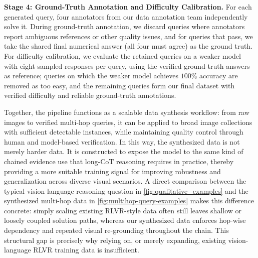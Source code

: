 \textbf{Stage 4: Ground-Truth Annotation and Difficulty Calibration.}
For each generated query, four annotators from our data annotation team independently solve it.
During ground-truth annotation, we discard queries where annotators report ambiguous references or other quality issues, and for queries that pass, we take the shared final numerical answer (all four must agree) as the ground truth.
For difficulty calibration, we evaluate the retained queries on a weaker model with eight sampled responses per query, using the verified ground-truth answers as reference; queries on which the weaker model achieves $100\%$ accuracy are removed as too easy, and the remaining queries form our final dataset with verified difficulty and reliable ground-truth annotations.

Together, the pipeline functions as a scalable data synthesis workflow: from raw images to verified multi-hop queries, it can be applied to broad image collections with sufficient detectable instances, while maintaining quality control through human and model-based verification.
In this way, the synthesized data is not merely harder data.
It is constructed to expose the model to the same kind of chained evidence use that long-CoT reasoning requires in practice, thereby providing a more suitable training signal for improving robustness and generalization across diverse visual scenarios.
A direct comparison between the typical vision-language reasoning question in \cref{fig:qualitative_examples} and the synthesized multi-hop data in \cref{fig:multihop-query-examples} makes this difference concrete: simply scaling existing RLVR-style data often still leaves shallow or loosely coupled solution paths, whereas our synthesized data enforces hop-wise dependency and repeated visual re-grounding throughout the chain.
This structural gap is precisely why relying on, or merely expanding, existing vision-language RLVR training data is insufficient.
